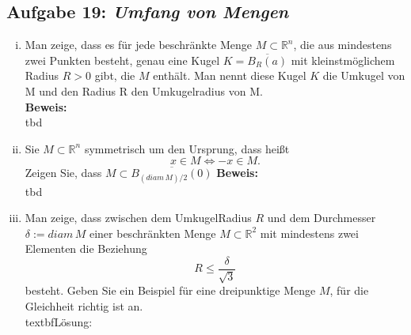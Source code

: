 \documentclass[11pt,a4paper,ngerman]{article}
\begin{document}
\subsection*{Aufgabe 19: \mdseries\itshape Umfang von Mengen}
	\begin{enumerate}[(i)]
		\item Man zeige, dass es für jede beschränkte Menge $M \subset \mathbb{R}^n$, die aus mindestens zwei Punkten besteht,
		genau eine Kugel $K = \overline{B_R(a)}$ mit kleinstmöglichem Radius $R > 0$ gibt, die $M$ enthält. Man nennt diese Kugel 
		$K$ die Umkugel von M und den Radius R den Umkugelradius von M.\\
		\textbf{Beweis:}\\
            tbd

		\item Sie $M \subset \mathbb{R}^n$ symmetrisch um den Ursprung, dass heißt
			$$
				x \in M \Longleftrightarrow -x \in M.
			$$
			Zeigen Sie, dass $M \subset \overline{B_{(diam \, M )/ 2}(0)}$
		\textbf{Beweis:}\\
           tbd 

		\item Man zeige, dass zwischen dem UmkugelRadius $R$ und dem Durchmesser $\delta := diam \, M$ einer beschränkten Menge
		 $M \subset \mathbb{R}^2$ mit mindestens zwei Elementen die Beziehung
			$$
				R \leq \frac{\delta}{\sqrt{3}}
			$$
		besteht. Geben Sie ein Beispiel für eine dreipunktige Menge $M$, für die Gleichheit richtig ist an.\\
		textbf{Lösung:}\\
			
	\end{enumerate}

\label{LastPage}
\end{document}
